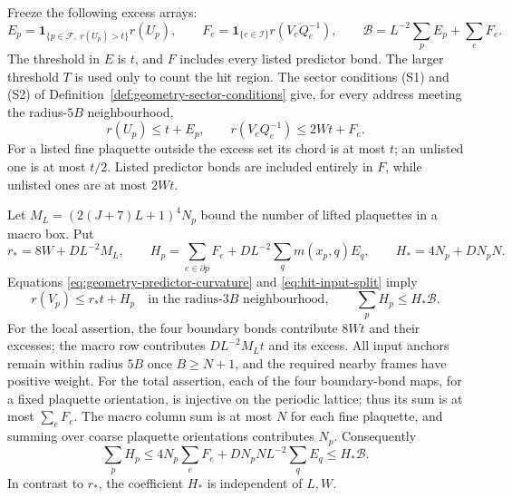 Freeze the following excess arrays:
\[
 E_p=\mathbf1_{\{p\in\mathcal F,\ r(U_p)>t\}}r(U_p),\qquad
 F_e=\mathbf1_{\{e\in\mathcal I\}}r(V_eQ_e^{-1}),\qquad
 \mathcal B=L^{-2}\sum_pE_p+\sum_eF_e.
\]
The threshold in $E$ is $t$, and $F$ includes every listed predictor
bond. The larger threshold $T$ is used only to count the hit region.
The sector conditions (S1) and (S2) of
Definition~\ref{def:geometry-sector-conditions} give, for every
address meeting the radius-$5B$ neighbourhood,
\begin{equation}\label{eq:hit-input-split}
 r(U_p)\le t+E_p,\qquad r(V_eQ_e^{-1})\le2Wt+F_e.
\end{equation}
For a listed fine plaquette outside the excess set its chord is at
most $t$; an unlisted one is at most $t/2$. Listed predictor bonds
are included entirely in $F$, while unlisted ones are at most $2Wt$.

Let $M_L=(2(J+7)L+1)^4N_p$ bound the number of lifted plaquettes in
a macro box. Put
\[
 r_* =8W+DL^{-2}M_L,\qquad
 H_p=\sum_{e\in\partial p}F_e+DL^{-2}\sum_qm(x_p,q)E_q,
 \qquad H_*=4N_p+DN_pN.
\]
Equations \eqref{eq:geometry-predictor-curvature} and
\eqref{eq:hit-input-split} imply
\begin{equation}\label{eq:hit-coarse-split}
 r(V_p)\le r_*t+H_p
 \quad\text{in the radius-$3B$ neighbourhood},\qquad
 \sum_pH_p\le H_*\mathcal B.
\end{equation}
For the local assertion, the four boundary bonds contribute $8Wt$
and their excesses; the macro row contributes $DL^{-2}M_Lt$ and
its excess. All input anchors remain within radius $5B$ once
$B\ge N+1$, and the required nearby frames have positive weight.
For the total assertion, each of the four boundary-bond maps, for a
fixed plaquette orientation, is injective on the periodic lattice;
thus its sum is at most $\sum_eF_e$. The macro column sum is at most
$N$ for each fine plaquette, and summing over coarse plaquette
orientations contributes $N_p$. Consequently
\[
 \sum_pH_p\le4N_p\sum_eF_e+DN_pN L^{-2}\sum_qE_q
       \le H_*\mathcal B.
\]
In contrast to $r_*$, the coefficient $H_*$ is independent of $L,W$.

